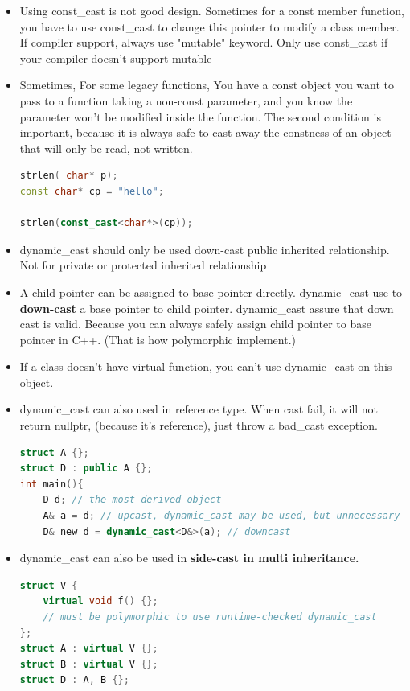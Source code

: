 \documentclass[a4paper,12pt,twoside]{book}
\begin{document}
\begin{itemize}
\item Using const\_cast is not good design. Sometimes for a const member function, you have to use const\_cast to change this pointer to modify a class member. If compiler support, always use "mutable"  keyword.  Only use const\_cast if your compiler doesn't support mutable

\item Sometimes, For some legacy functions, You have a const object you want to pass to a function taking a non-const parameter, and you know the parameter won't be modified inside the function. The second condition is important, because it is always safe to cast away the constness of an object that will only be read, not written.

\begin{lstlisting}[frame=single, language=c++, mathescape=true]
strlen( char* p);
const char* cp = "hello";

strlen(const_cast<char*>(cp));
\end{lstlisting}

\item dynamic\_cast should only be used down-cast public inherited relationship. Not for private or protected inherited relationship

\item A child pointer can be assigned to base pointer directly. dynamic\_cast use to \textbf{down-cast} a base pointer to child pointer. dynamic\_cast assure that down cast is valid. Because you can always safely assign child pointer to base pointer in C++. (That is how polymorphic implement.)

\item If a class doesn't have virtual function, you can't use dynamic\_cast on this object.
\item dynamic\_cast can also used in reference type. When cast fail, it will not return nullptr, (because it's reference), just throw a bad\_cast exception.
\begin{lstlisting}[frame=single, language=c++, mathescape=true]
struct A {};
struct D : public A {};
int main(){
    D d; // the most derived object
    A& a = d; // upcast, dynamic_cast may be used, but unnecessary
    D& new_d = dynamic_cast<D&>(a); // downcast
\end{lstlisting}


\item dynamic\_cast can also be used in \textbf{side-cast in multi inheritance. }
\begin{lstlisting}[frame=single, language=c++, mathescape=true]
struct V {
    virtual void f() {};
    // must be polymorphic to use runtime-checked dynamic_cast
};
struct A : virtual V {};
struct B : virtual V {};
struct D : A, B {};


\end{lstlisting}
\end{itemize}
\end{document}
